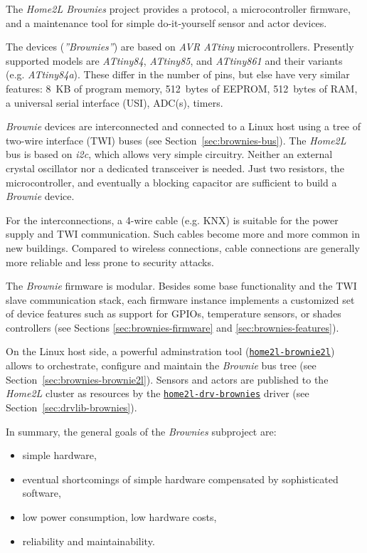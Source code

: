 \documentclass[12pt,english,parskip=half,headheight=19pt]{scrreprt}
\newcommand{\idx}[1]{#1\index{#1}}
\newcommand{\reftool}[1]{\hyperref[tool:#1]{\texttt{\idx{#1}}}}
\begin{document}
The \textit{Home2L Brownies} project provides a protocol, a microcontroller firmware, and a maintenance tool for simple do-it-yourself sensor and actor devices.

The devices (\textit{''Brownies''}) are based on \textit{AVR ATtiny} microcontrollers. Presently supported models are \textit{ATtiny84}, \textit{ATtiny85}, and \textit{ATtiny861} and their variants (e.g. \textit{ATtiny84a}). These differ in the number of pins, but else have very similar features: 8~KB of program memory, 512~bytes of EEPROM, 512~bytes of RAM, a universal serial interface (USI), ADC(s), timers.

\textit{Brownie} devices are interconnected and connected to a Linux host using a tree of two-wire interface (TWI) buses (see Section~\ref{sec:brownies-bus}). The \textit{Home2L} bus is based on \textit{i2c}, which allows very simple circuitry. Neither an external crystal oscillator nor a dedicated transceiver is needed. Just two resistors, the microcontroller, and eventually a blocking capacitor are sufficient to build a \textit{Brownie} device.

For the interconnections, a 4-wire cable (e.g. KNX) is suitable for the power supply and TWI communication. Such cables become more and more common in new buildings. Compared to wireless connections, cable connections are generally more reliable and less prone to security attacks.

The \textit{Brownie} firmware is modular. Besides some base functionality and the TWI slave communication stack, each firmware instance implements a customized set of device features such as support for GPIOs, temperature sensors, or shades controllers (see Sections \ref{sec:brownies-firmware} and \ref{sec:brownies-features}).

On the Linux host side, a powerful adminstration tool (\reftool{home2l-brownie2l}) allows to orchestrate, configure and maintain the \textit{Brownie} bus tree (see Section~\ref{sec:brownies-brownie2l}). Sensors and actors are published to the \textit{Home2L} cluster as resources by the \reftool{home2l-drv-brownies} driver (see Section~\ref{sec:drvlib-brownies}).

In summary, the general goals of the \textit{Brownies} subproject are:
\begin{itemize}
  \item simple hardware,
  \item eventual shortcomings of simple hardware compensated by sophisticated software,
  \item low power consumption, low hardware costs,
  \item reliability and maintainability.
\end{itemize}
\end{document}
